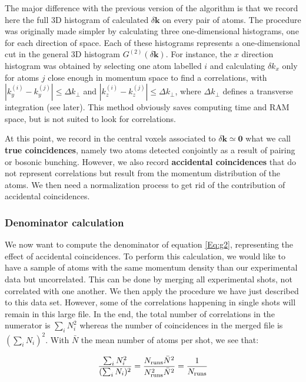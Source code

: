 The major difference with the previous version of the algorithm is that we record here the full 3D histogram of calculated $\delta \bm{k}$ on every pair of atoms. The procedure was originally made simpler by calculating three one-dimensional histograms, one for each direction of space. Each of these histograms represents a one-dimensional cut in the general 3D histogram $G^{(2)}(\delta \bm{k})$. For instance, the $x$ direction histogram was obtained by selecting one atom labelled $i$ and calculating $\delta k_x$ only for atoms $j$ close enough in momentum space to find a \kk correlations, \ie with $|k_y^{(i)}-k_y^{(j)}| \leq \Delta k_{\perp}$ and $|k_z^{(i)}-k_z^{(j)}| \leq \Delta k_{\perp}$, where $\Delta k_{\perp}$ defines a transverse integration (see later). This method obviously saves computing time and RAM space, but is not suited to look for \kmk correlations.

At this point, we record in the central voxels associated to $\delta \bm{k} \simeq \bm{0}$ what we call \textbf{true coincidences}, namely two atoms detected conjointly as a result of \kmk pairing or bosonic bunching. However, we also record \textbf{accidental coincidences} that do not represent correlations but result from the momentum distribution of the atoms. We then need a normalization process to get rid of the contribution of accidental coincidences. 

\subsubsection{Denominator calculation}

\label{sec:algo}

We now want to compute the denominator of equation \ref{Eq:g2}, representing the effect of accidental coincidences. To perform this calculation, we would like to have a sample of atoms with the same momentum density than our experimental data but uncorrelated. This can be done by merging all experimental shots, not correlated with one another. We then apply the procedure we have just described to this data set. However, some of the correlations happening in single shots will remain in this large file. In the end, the total number of correlations in the numerator is $\sum_i N_i^2$ whereas the number of coincidences in the merged file is $(\sum_i N_i)^2$. With $\bar{N}$ the mean number of atoms per shot, we see that:

\begin{equation}
      \frac{\sum_i N_i^2}{(\sum_i N_i)^2}=\frac{N_{\rm{runs}} \bar{N}^2}{N_{\rm{runs}}^2 \bar{N}^2}=\frac{1}{N_{\rm{runs}}}
\end{equation}{}

